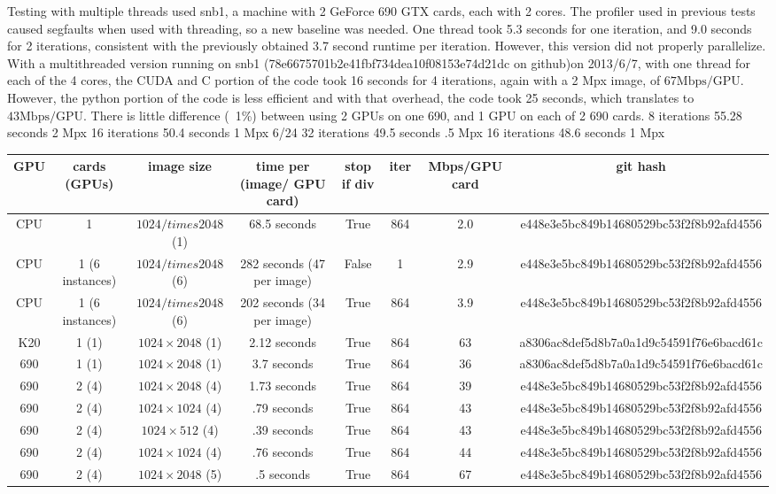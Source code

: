 \documentclass{article}
\begin{document}
	Testing with multiple threads used snb1, a machine with 2 GeForce 690 GTX cards, each with 2 cores. The profiler used in previous tests caused segfaults when used with threading, so a new baseline was needed.  One thread took 5.3 seconds for one iteration, and 9.0 seconds for 2 iterations, consistent with the previously obtained 3.7 second runtime per iteration.  However, this version did not properly parallelize.
	With a multithreaded version running on snb1 (78e6675701b2e41fbf734dea10f08153e74d21dc on github)on 2013/6/7, with one thread for each of the 4 cores, the CUDA and C portion of the code took 16 seconds for 4 iterations, again with a 2 Mpx image, of $67 \mathrm{Mbps/GPU}$.  However, the python portion of the code is less efficient and with that overhead, the code took 25 seconds, which translates to $43 \mathrm{Mbps/GPU}$.  There is little difference (~1\%) between using 2 GPUs on one 690, and 1 GPU on each of 2 690 cards.
	8 iterations 55.28 seconds 2 Mpx
	16 iterations 50.4 seconds 1 Mpx
	6/24
	32 iterations 49.5 seconds .5 Mpx
	16 iterations 48.6 seconds 1 Mpx
	
	\begin{tabular}{c|c|c|c|c|c|c|c}
	GPU & cards (GPUs) & image size & time per (image/ GPU card) & stop if div & iter & Mbps/GPU card & git hash \\
	\hline
	CPU & 1	& $1024 /times 2048$ (1)& 68.5 seconds & True & 864 & 2.0 & e448e3e5bc849b14680529bc53f2f8b92afd4556\\
	CPU & 1 (6 instances) & $1024 /times 2048$ (6)& 282 seconds (47 per image) & False & 1 & 2.9 & e448e3e5bc849b14680529bc53f2f8b92afd4556\\
	
	CPU & 1 (6 instances) & $1024 /times 2048$ (6)& 202 seconds (34 per image) & True & 864 & 3.9 & e448e3e5bc849b14680529bc53f2f8b92afd4556\\
	K20 & 1 (1) & $1024 \times 2048$ (1)& 2.12 seconds & True & 864 &  63 & a8306ac8def5d8b7a0a1d9c54591f76e6bacd61c \\
	690 & 1 (1) & $1024 \times 2048$ (1)& 3.7 seconds & True & 864 &  36 & a8306ac8def5d8b7a0a1d9c54591f76e6bacd61c \\
	690 & 2 (4) & $1024 \times 2048$ (4) & 1.73 seconds & True & 864 & 39 & e448e3e5bc849b14680529bc53f2f8b92afd4556 \\
	690 & 2 (4) & $1024 \times 1024$ (4)& .79 seconds & True & 864 & 43 & e448e3e5bc849b14680529bc53f2f8b92afd4556 \\
	690 & 2 (4) & $1024 \times 512$ (4)& .39 seconds & True & 864 & 43 & e448e3e5bc849b14680529bc53f2f8b92afd4556 \\
	690 & 2 (4) & $1024 \times 1024$ (4)& .76 seconds & True & 864 & 44 & e448e3e5bc849b14680529bc53f2f8b92afd4556 \\
	690 & 2 (4) & $1024 \times 2048$ (5)& .5 seconds & True & 864 & 67 & e448e3e5bc849b14680529bc53f2f8b92afd4556
	\end{tabular}
\end{document}
